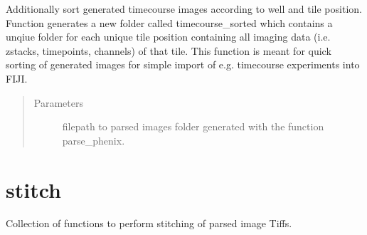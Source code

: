 \documentclass[a4paper,10pt,english,openany,oneside]{sphinxmanual}
\begin{document}

\begin{fulllineitems}
\label{\detokenize{pages/modules:vipertools.parse.sort_timepoints}}
\sphinxAtStartPar
Additionally sort generated timecourse images according to well and tile position. Function
generates a new folder called timecourse\_sorted which contains a unqiue folder for each unique tile
position containing all imaging data (i.e. zstacks, timepoints, channels) of that tile.
This function is meant for quick sorting of generated images for simple import of e.g. timecourse
experiments into FIJI.
\begin{quote}\begin{description}
\item[{Parameters}] \leavevmode
\sphinxAtStartPar
{} \textendash{} filepath to parsed images folder generated with the function parse\_phenix.

\end{description}\end{quote}

\end{fulllineitems}

\label{\detokenize{pages/modules:module-vipertools.stitch}}

\section{stitch}
\label{\detokenize{pages/modules:stitch}}
\sphinxAtStartPar
Collection of functions to perform stitching of parsed image Tiffs.
\end{document}
